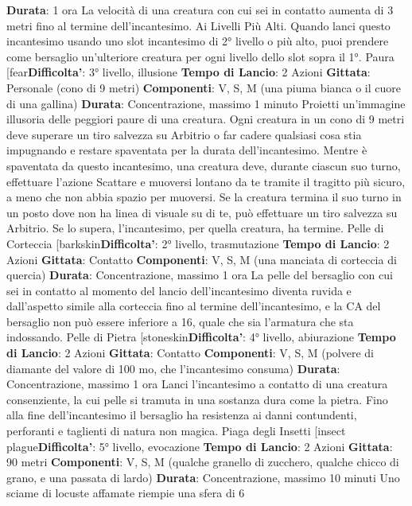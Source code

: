 \begin{multicols}{2}
\textbf{Durata}: 1 ora
La velocità di una creatura con cui sei in contatto
aumenta di 3 metri fino al termine dell’incantesimo.
Ai Livelli Più Alti. Quando lanci questo incantesimo
usando uno slot incantesimo di 2° livello o più alto, puoi
prendere come bersaglio un’ulteriore creatura per ogni
livello dello slot sopra il 1°.
Paura
[fear\textbf{Difficolta'}:
3° livello, illusione
\textbf{Tempo di Lancio}: 2 Azioni
\textbf{Gittata}: Personale (cono di 9 metri)
\textbf{Componenti}: V, S, M (una piuma bianca o il cuore di
una gallina)
\textbf{Durata}: Concentrazione, massimo 1 minuto
Proietti un’immagine illusoria delle peggiori paure di una
creatura. Ogni creatura in un cono di 9 metri deve
superare un tiro salvezza su Arbitrio o far cadere
qualsiasi cosa stia impugnando e restare spaventata
per la durata dell’incantesimo.
Mentre è spaventata da questo incantesimo, una
creatura deve, durante ciascun suo turno, effettuare
l’azione Scattare e muoversi lontano da te tramite il
tragitto più sicuro, a meno che non abbia spazio per
muoversi. Se la creatura termina il suo turno in un posto
dove non ha linea di visuale su di te, può effettuare un
tiro salvezza su Arbitrio. Se lo supera, l’incantesimo,
per quella creatura, ha termine.
Pelle di Corteccia
[barkskin\textbf{Difficolta'}:
2° livello, trasmutazione
\textbf{Tempo di Lancio}: 2 Azioni
\textbf{Gittata}: Contatto
\textbf{Componenti}: V, S, M (una manciata di corteccia di
quercia)
\textbf{Durata}: Concentrazione, massimo 1 ora
La pelle del bersaglio con cui sei in contatto al
momento del lancio dell’incantesimo diventa ruvida e
dall’aspetto simile alla corteccia fino al termine
dell’incantesimo, e la CA del bersaglio non può essere
inferiore a 16, quale che sia l’armatura che sta
indossando.
Pelle di Pietra
[stoneskin\textbf{Difficolta'}:
4° livello, abiurazione
\textbf{Tempo di Lancio}: 2 Azioni
\textbf{Gittata}: Contatto
\textbf{Componenti}: V, S, M (polvere di diamante del valore di
100 mo, che l’incantesimo consuma)
\textbf{Durata}: Concentrazione, massimo 1 ora
Lanci l’incantesimo a contatto di una creatura
consenziente, la cui pelle si tramuta in una sostanza
dura come la pietra. Fino alla fine dell’incantesimo il
bersaglio ha resistenza ai danni contundenti, perforanti
e taglienti di natura non magica.
Piaga degli Insetti
[insect plague\textbf{Difficolta'}:
5° livello, evocazione
\textbf{Tempo di Lancio}: 2 Azioni
\textbf{Gittata}: 90 metri
\textbf{Componenti}: V, S, M (qualche granello di zucchero,
qualche chicco di grano, e una passata di lardo)
\textbf{Durata}: Concentrazione, massimo 10 minuti
Uno sciame di locuste affamate riempie una sfera di 6

\end{multicols}
